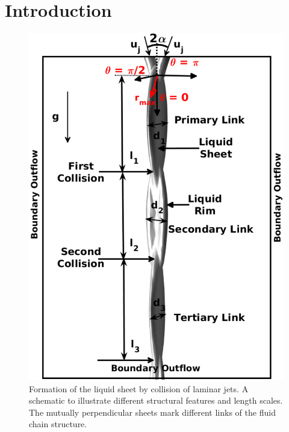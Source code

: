 \documentclass[%
aip,
sd,%
amsmath,amssymb,
preprint,%
author-year,%
]{revtex4-1}
\begin{document}
\section{Introduction}\label{Sec::Introduction}
\begin{figure}[H]
	\centering
	\includegraphics[width=0.6\linewidth]{schematic}
	\caption{Formation of the liquid sheet by collision of laminar jets. A schematic to illustrate different structural features and length scales. The mutually perpendicular sheets mark different links of the fluid chain structure.}
	\label{Figure::schematic}
\end{figure}
\end{document}
